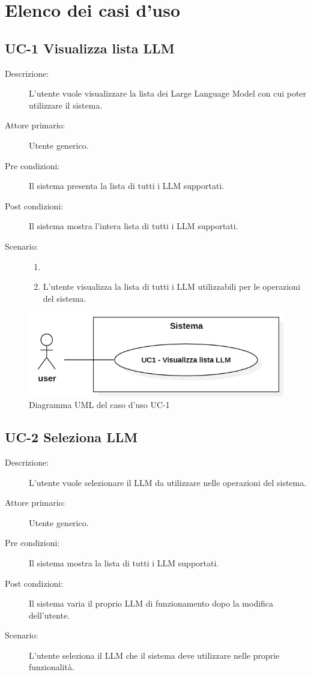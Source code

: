 \newpage

\section{Elenco dei casi d'uso}

\subsection{UC-1 Visualizza lista LLM}
\begin{description}
    \item[Descrizione:] L’utente vuole visualizzare la lista dei Large Language Model con cui poter utilizzare il sistema.
    \item[Attore primario:] Utente generico.
    \item[Pre condizioni:] Il sistema presenta la lista di tutti i LLM supportati.
    \item[Post condizioni:] Il sistema mostra l’intera lista di tutti i LLM supportati.
    \item[Scenario:] 
    \begin{enumerate}
        \item[]
        \item L’utente visualizza la lista di tutti i LLM utilizzabili per le operazioni del sistema.
    \end{enumerate}
\end{description}

\begin{figure}[H]
    \centering
    \includegraphics[width=0.8\linewidth]{UC1.PNG}
    \caption{Diagramma UML del caso d'uso UC-1}
    \label{fig:UC1}
\end{figure}

\subsection{UC-2 Seleziona LLM}
\begin{description}
    \item[Descrizione:] L’utente vuole selezionare il LLM da utilizzare nelle operazioni del sistema.
    \item[Attore primario:] Utente generico.
    \item[Pre condizioni:] Il sistema mostra la lista di tutti i LLM supportati.
    \item[Post condizioni:] Il sistema varia il proprio LLM di funzionamento dopo la modifica dell'utente.
    \item[Scenario:]  L'utente seleziona il LLM che il sistema deve utilizzare nelle proprie funzionalità.
    
\end{description}


